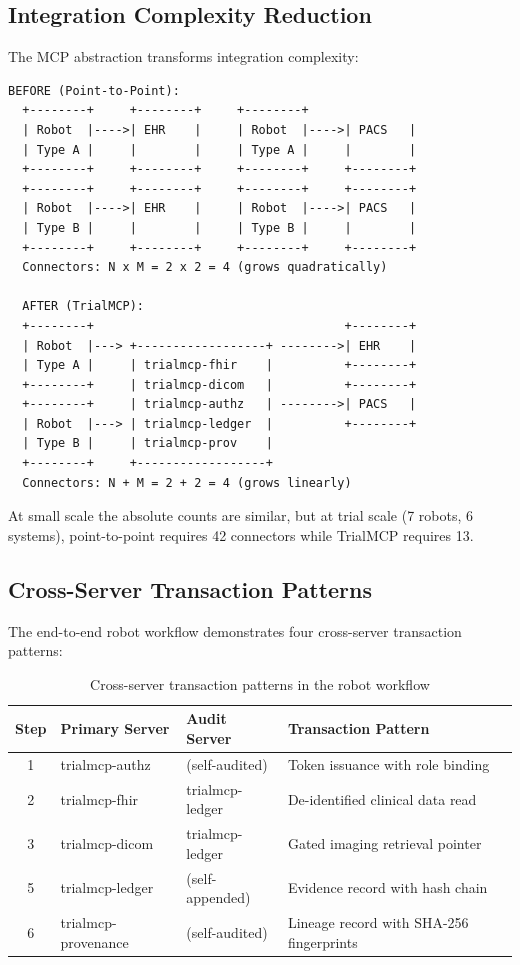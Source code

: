 \documentclass[10pt,letterpaper]{article}
\begin{document}
\subsection{Integration Complexity Reduction}

The MCP abstraction transforms integration complexity:

\begin{lstlisting}[title={\textbf{Integration Complexity: Before and After MCP}}]
  BEFORE (Point-to-Point):
  +--------+     +--------+     +--------+
  | Robot  |---->| EHR    |     | Robot  |---->| PACS   |
  | Type A |     |        |     | Type A |     |        |
  +--------+     +--------+     +--------+     +--------+
  +--------+     +--------+     +--------+     +--------+
  | Robot  |---->| EHR    |     | Robot  |---->| PACS   |
  | Type B |     |        |     | Type B |     |        |
  +--------+     +--------+     +--------+     +--------+
  Connectors: N x M = 2 x 2 = 4 (grows quadratically)

  AFTER (TrialMCP):
  +--------+                                   +--------+
  | Robot  |---> +------------------+ -------->| EHR    |
  | Type A |     | trialmcp-fhir    |          +--------+
  +--------+     | trialmcp-dicom   |          +--------+
  +--------+     | trialmcp-authz   | -------->| PACS   |
  | Robot  |---> | trialmcp-ledger  |          +--------+
  | Type B |     | trialmcp-prov    |
  +--------+     +------------------+
  Connectors: N + M = 2 + 2 = 4 (grows linearly)
\end{lstlisting}

At small scale the absolute counts are similar, but at trial scale (7 robots, 6 systems), point-to-point requires 42 connectors while TrialMCP requires 13.

\subsection{Cross-Server Transaction Patterns}

The end-to-end robot workflow demonstrates four cross-server transaction patterns:

\begin{table}[H]
\centering
\caption{Cross-server transaction patterns in the robot workflow}
\label{tab:transactions}
\small
\begin{tabularx}{\textwidth}{c l l X}
\toprule
\textbf{Step} & \textbf{Primary Server} & \textbf{Audit Server} & \textbf{Transaction Pattern} \\
\midrule
1 & trialmcp-authz & (self-audited) & Token issuance with role binding \\
2 & trialmcp-fhir & trialmcp-ledger & De-identified clinical data read \\
3 & trialmcp-dicom & trialmcp-ledger & Gated imaging retrieval pointer \\
5 & trialmcp-ledger & (self-appended) & Evidence record with hash chain \\
6 & trialmcp-provenance & (self-audited) & Lineage record with SHA-256 fingerprints \\
\bottomrule
\end{tabularx}
\end{table}
\end{document}
